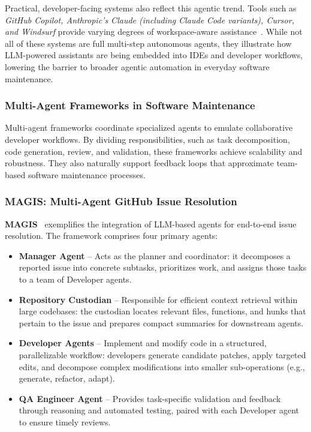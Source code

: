 Practical, developer-facing systems also reflect this agentic trend. Tools such as \emph{GitHub Copilot, Anthropic's Claude (including Claude Code variants), Cursor, and Windsurf} provide varying degrees of workspace-aware assistance~\cite{github_copilot,anthropic_claude,cursor_ai,windsurf_ai}. While not all of these systems are full multi-step autonomous agents, they illustrate how LLM-powered assistants are being embedded into IDEs and developer workflows, lowering the barrier to broader agentic automation in everyday software maintenance.

\subsubsection*{Multi-Agent Frameworks in Software Maintenance}
Multi-agent frameworks coordinate specialized agents to emulate collaborative developer workflows. By dividing responsibilities, such as task decomposition, code generation, review, and validation, these frameworks achieve scalability and robustness. They also naturally support feedback loops that approximate team-based software maintenance processes.

\subsubsection{MAGIS: Multi-Agent GitHub Issue Resolution}
\textbf{MAGIS}~\cite{magis} exemplifies the integration of LLM-based agents for end-to-end issue resolution. The framework comprises four primary agents:

\begin{itemize}
    \item \textbf{Manager Agent} -- Acts as the planner and coordinator: it decomposes a reported issue into concrete subtasks, prioritizes work, and assigns those tasks to a team of Developer agents.
    \item \textbf{Repository Custodian} -- Responsible for efficient context retrieval within large codebases: the custodian locates relevant files, functions, and hunks that pertain to the issue and prepares compact summaries for downstream agents.
    \item \textbf{Developer Agents} -- Implement and modify code in a structured, parallelizable workflow: developers generate candidate patches, apply targeted edits, and decompose complex modifications into smaller sub-operations (e.g., generate, refactor, adapt). 
    \item \textbf{QA Engineer Agent} -- Provides task-specific validation and feedback through reasoning and automated testing, paired with each Developer agent to ensure timely reviews. 
\end{itemize}

